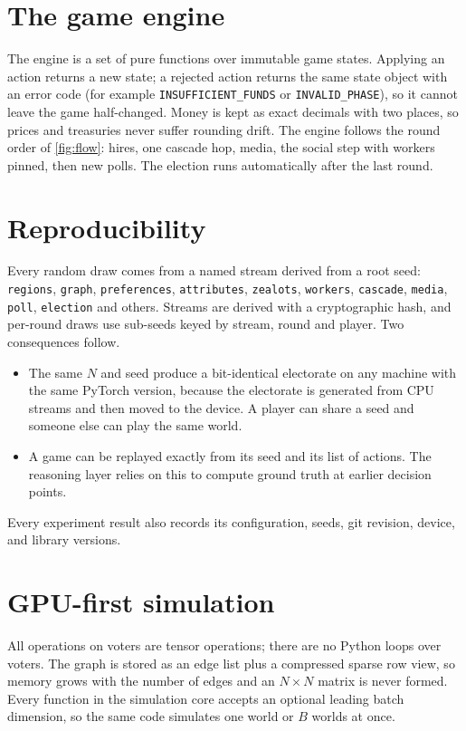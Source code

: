 \documentclass[11pt,a4paper,oneside]{report}
\newcommand{\code}[1]{\texttt{#1}}
\begin{document}
\section{The game engine}

The engine is a set of pure functions over immutable game states. Applying an action returns a new state;
a rejected action returns the same state object with an error code (for example \code{INSUFFICIENT\_FUNDS}
or \code{INVALID\_PHASE}), so it cannot leave the game half-changed. Money is kept as exact decimals with
two places, so prices and treasuries never suffer rounding drift. The engine follows the round order of
\cref{fig:flow}: hires, one cascade hop, media, the social step with workers pinned, then new polls. The
election runs automatically after the last round.

\section{Reproducibility}

Every random draw comes from a named stream derived from a root seed: \code{regions}, \code{graph},
\code{preferences}, \code{attributes}, \code{zealots}, \code{workers}, \code{cascade}, \code{media},
\code{poll}, \code{election} and others. Streams are derived with a cryptographic hash, and per-round draws
use sub-seeds keyed by stream, round and player. Two consequences follow.
\begin{itemize}
  \item The same $N$ and seed produce a bit-identical electorate on any machine with the same PyTorch
        version, because the electorate is generated from CPU streams and then moved to the device. A
        player can share a seed and someone else can play the same world.
  \item A game can be replayed exactly from its seed and its list of actions. The reasoning layer relies on
        this to compute ground truth at earlier decision points.
\end{itemize}
Every experiment result also records its configuration, seeds, git revision, device, and library versions.

\section{GPU-first simulation}

All operations on voters are tensor operations; there are no Python loops over voters. The graph is stored
as an edge list plus a compressed sparse row view, so memory grows with the number of edges and an
$N\times N$ matrix is never formed. Every function in the simulation core accepts an optional leading batch
dimension, so the same code simulates one world or $B$ worlds at once.
\end{document}
